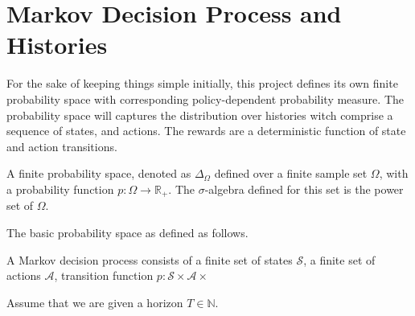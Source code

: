 %

\newcommand{\Nats}{\mathbb{N}}
\newcommand{\Real}{\mathbb{R}}


\section{Markov Decision Process and Histories}

For the sake of keeping things simple initially, this project defines its own finite probability space with corresponding policy-dependent probability measure. The probability space will captures the distribution over histories witch comprise a sequence of states, and actions. The rewards are a deterministic function of state and action transitions. 

\begin{definition}
A finite probability space, denoted as $\Delta_{\Omega}$ defined over a finite sample set $\Omega$, with a probability function $p\colon \Omega \to \Real_+$. The $\sigma$-algebra defined for this set is the power set of $\Omega$.
  \leanok
\end{definition}


The basic probability space as defined as follows.
\begin{definition}
  A Markov decision process consists of a finite set of states $\mathcal{S}$, a finite set of actions $\mathcal{A}$, transition function $p\colon \mathcal{S} \times \mathcal{A} \times $
  \leanok
\end{definition}

Assume that we are given a horizon $T \in \Nats$.
\begin{definition}[History]
  
\end{definition}

